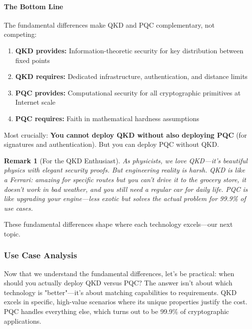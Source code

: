 \documentclass[11pt,a4paper]{article}
\newtheorem{remark}{Remark}
\begin{document}
\paragraph{The Bottom Line}

The fundamental differences make QKD and PQC complementary, not competing:

\begin{enumerate}
    \item \textbf{QKD provides:} Information-theoretic security for key distribution between fixed points
    \item \textbf{QKD requires:} Dedicated infrastructure, authentication, and distance limits
    \item \textbf{PQC provides:} Computational security for all cryptographic primitives at Internet scale
    \item \textbf{PQC requires:} Faith in mathematical hardness assumptions
\end{enumerate}

Most crucially: \textbf{You cannot deploy QKD without also deploying PQC} (for signatures and authentication). But you can deploy PQC without QKD.

\begin{remark}[For the QKD Enthusiast]
As physicists, we love QKD---it's beautiful physics with elegant security proofs. But engineering reality is harsh. QKD is like a Ferrari: amazing for specific routes but you can't drive it to the grocery store, it doesn't work in bad weather, and you still need a regular car for daily life. PQC is like upgrading your engine---less exotic but solves the actual problem for 99.9\% of use cases.
\end{remark}

These fundamental differences shape where each technology excels---our next topic.

\subsubsection{Use Case Analysis}

Now that we understand the fundamental differences, let's be practical: when should you actually deploy QKD versus PQC? The answer isn't about which technology is "better"---it's about matching capabilities to requirements. QKD excels in specific, high-value scenarios where its unique properties justify the cost. PQC handles everything else, which turns out to be 99.9\% of cryptographic applications.
\end{document}
